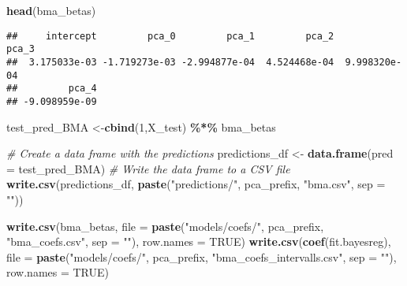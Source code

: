 \documentclass[
]{article}
\newenvironment{Shaded}{\begin{snugshade}}{\end{snugshade}}
\newcommand{\AttributeTok}[1]{\textcolor[rgb]{0.13,0.29,0.53}{#1}}
\newcommand{\CommentTok}[1]{\textcolor[rgb]{0.56,0.35,0.01}{\textit{#1}}}
\newcommand{\ConstantTok}[1]{\textcolor[rgb]{0.56,0.35,0.01}{#1}}
\newcommand{\DecValTok}[1]{\textcolor[rgb]{0.00,0.00,0.81}{#1}}
\newcommand{\FunctionTok}[1]{\textcolor[rgb]{0.13,0.29,0.53}{\textbf{#1}}}
\newcommand{\NormalTok}[1]{#1}
\newcommand{\OtherTok}[1]{\textcolor[rgb]{0.56,0.35,0.01}{#1}}
\newcommand{\SpecialCharTok}[1]{\textcolor[rgb]{0.81,0.36,0.00}{\textbf{#1}}}
\newcommand{\StringTok}[1]{\textcolor[rgb]{0.31,0.60,0.02}{#1}}
\begin{document}
\begin{Shaded}
\begin{Highlighting}[]
\FunctionTok{head}\NormalTok{(bma\_betas)}
\end{Highlighting}
\end{Shaded}

\begin{verbatim}
##     intercept         pca_0         pca_1         pca_2         pca_3 
##  3.175033e-03 -1.719273e-03 -2.994877e-04  4.524468e-04  9.998320e-04 
##         pca_4 
## -9.098959e-09
\end{verbatim}

\begin{Shaded}
\begin{Highlighting}[]
\NormalTok{test\_pred\_BMA }\OtherTok{\textless{}{-}}\FunctionTok{cbind}\NormalTok{(}\DecValTok{1}\NormalTok{,X\_test) }\SpecialCharTok{\%*\%}\NormalTok{ bma\_betas}
\end{Highlighting}
\end{Shaded}

\begin{Shaded}
\begin{Highlighting}[]
\CommentTok{\# Create a data frame with the predictions}
\NormalTok{predictions\_df }\OtherTok{\textless{}{-}} \FunctionTok{data.frame}\NormalTok{(}\AttributeTok{pred =}\NormalTok{ test\_pred\_BMA)}
\CommentTok{\# Write the data frame to a CSV file}
\FunctionTok{write.csv}\NormalTok{(predictions\_df, }\FunctionTok{paste}\NormalTok{(}\StringTok{"predictions/"}\NormalTok{, pca\_prefix, }\StringTok{"bma.csv"}\NormalTok{, }\AttributeTok{sep =} \StringTok{""}\NormalTok{))}
\end{Highlighting}
\end{Shaded}

\begin{Shaded}
\begin{Highlighting}[]
\FunctionTok{write.csv}\NormalTok{(bma\_betas, }\AttributeTok{file =} \FunctionTok{paste}\NormalTok{(}\StringTok{"models/coefs/"}\NormalTok{, pca\_prefix, }\StringTok{"bma\_coefs.csv"}\NormalTok{, }\AttributeTok{sep =} \StringTok{""}\NormalTok{), }\AttributeTok{row.names =} \ConstantTok{TRUE}\NormalTok{)}
\FunctionTok{write.csv}\NormalTok{(}\FunctionTok{coef}\NormalTok{(fit.bayesreg), }\AttributeTok{file =} \FunctionTok{paste}\NormalTok{(}\StringTok{"models/coefs/"}\NormalTok{, pca\_prefix, }\StringTok{"bma\_coefs\_intervalls.csv"}\NormalTok{, }\AttributeTok{sep =} \StringTok{""}\NormalTok{), }\AttributeTok{row.names =} \ConstantTok{TRUE}\NormalTok{)}
\end{Highlighting}
\end{Shaded}
\end{document}
